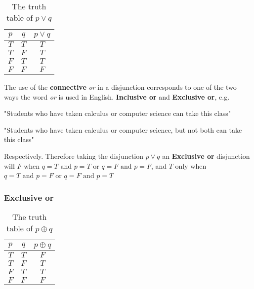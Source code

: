 \documentclass[12pt letter]{report}
\begin{document}
\begin{table}[h!]
	\caption{The truth table of $p \vee q$}\label{tab:3}
	\begin{center}
		\begin{tabular}{|c c|c|}
			\hline
			$p$ & $q$ & $p \vee q$ \\[0.5ex]
			\hline
			\hline
			$T$ & $T$ & $T$        \\
			$T$ & $F$ & $T$        \\
			$F$ & $T$ & $T$        \\
			$F$ & $F$ & $F$        \\
			\hline
		\end{tabular}
	\end{center}
\end{table}

The use of the \textbf{connective} \textit{or} in a disjunction corresponds to one of the two ways the word \textit{or}
is used in English. \textbf{Inclusive or} and \textbf{Exclusive or}, e.g.

"Students who have taken calculus or computer science can take this class"


"Students who have taken calculus or computer science, but not both can take this class"

Respectively. Therefore taking the disjunction $p \vee q$ an \textbf{Exclusive or} disjunction will $F$ when $q = T
	\text{ and } p = T$ or $q = F \text{ and } p = F$, and $T$ only when $q = T \text{ and } p = F$ or $q = F \text{ and
	} p = T$


\subsubsection{Exclusive or}

\begin{table}[h!]
	\caption{The truth table of $p \oplus q$}\label{tab:4}
	\begin{center}
		\begin{tabular}{|c c|c|}
			\hline
			$p$ & $q$ & $p \oplus q$ \\[0.5ex]
			\hline
			\hline
			$T$ & $T$ & $F$          \\
			$T$ & $F$ & $T$          \\
			$F$ & $T$ & $T$          \\
			$F$ & $F$ & $F$          \\
			\hline
		\end{tabular}
	\end{center}
\end{table}
\end{document}
